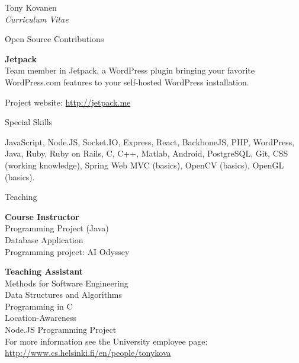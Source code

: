 \documentclass[10pt]{article}
\begin{document}
\begin{cv}{Tony Kovanen\\{\large \itshape Curriculum Vitae}}
\begin{cvlist}{Open Source Contributions}
	\item \textbf{Jetpack}\\
    Team member in Jetpack, a WordPress plugin bringing your favorite WordPress.com features to your self-hosted WordPress installation.
    	\item Project website: \url{http://jetpack.me}	
\end{cvlist}

\newpage %
\begin{cvlist}{Special Skills}
\item JavaScript, Node.JS, Socket.IO, Express, React, BackboneJS, PHP, WordPress, Java, Ruby, Ruby on Rails, C, C++, Matlab, Android, PostgreSQL, Git, CSS (working knowledge), Spring Web MVC (basics), OpenCV (basics), OpenGL (basics). 
\end{cvlist}

\begin{cvlist}{Teaching}
	\item {\bf Course Instructor}\\
    Programming Project (Java)\\
    Database Application\\
    Programming project: AI Odyssey
		
	\item {\bf Teaching Assistant}\\
	Methods for Software Engineering\\
    Data Structures and Algorithms\\
    Programming in C\\
    Location-Awareness\\
    Node.JS Programming Project\\

	
	For more information see the University employee page: \url{http://www.cs.helsinki.fi/en/people/tonykova}
\end{cvlist}	
\end{cv}
\end{document}
